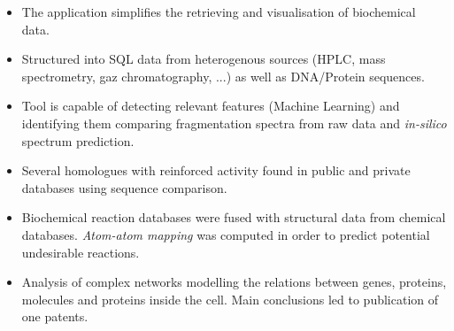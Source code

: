 \begin{itemize}
	\item The application simplifies the retrieving and visualisation of biochemical data.
	\item Structured into SQL data from heterogenous sources (HPLC, mass spectrometry, gaz chromatography, ...) as well as DNA/Protein sequences.
\end{itemize}
\smallskip

\begin{itemize}
	\item Tool is capable of detecting relevant features (Machine Learning) and identifying them comparing fragmentation spectra from raw data and \textit{in-silico} spectrum prediction.
\end{itemize}
\smallskip

\begin{itemize}
	\item Several homologues with reinforced activity found in public and private databases using sequence comparison.
\end{itemize}
\smallskip

\begin{itemize}
	\item Biochemical reaction databases were fused with structural data from chemical databases. \textit{Atom-atom mapping} was computed in order to predict potential undesirable reactions.
\end{itemize}
\smallskip

\begin{itemize}
	\item Analysis of complex networks modelling the relations between genes, proteins, molecules and proteins inside the cell. Main conclusions led to publication of one patents.
\end{itemize}
\smallskip


